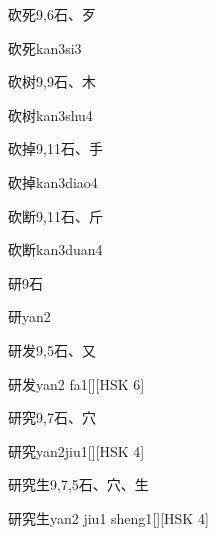 \begin{Entry}{砍死}{9,6}{⽯、⽍}
  \begin{Phonetics}{砍死}{kan3si3}
  \end{Phonetics}
\end{Entry}

\begin{Entry}{砍树}{9,9}{⽯、⽊}
  \begin{Phonetics}{砍树}{kan3shu4}
  \end{Phonetics}
\end{Entry}

\begin{Entry}{砍掉}{9,11}{⽯、⼿}
  \begin{Phonetics}{砍掉}{kan3diao4}
  \end{Phonetics}
\end{Entry}

\begin{Entry}{砍断}{9,11}{⽯、⽄}
  \begin{Phonetics}{砍断}{kan3duan4}
  \end{Phonetics}
\end{Entry}

\begin{Entry}{研}{9}{⽯}
  \begin{Phonetics}{研}{yan2}
  \end{Phonetics}
\end{Entry}

\begin{Entry}{研发}{9,5}{⽯、⼜}
  \begin{Phonetics}{研发}{yan2 fa1}[][HSK 6]
  \end{Phonetics}
\end{Entry}

\begin{Entry}{研究}{9,7}{⽯、⽳}
  \begin{Phonetics}{研究}{yan2jiu1}[][HSK 4]
  \end{Phonetics}
\end{Entry}

\begin{Entry}{研究生}{9,7,5}{⽯、⽳、⽣}
  \begin{Phonetics}{研究生}{yan2 jiu1 sheng1}[][HSK 4]
  \end{Phonetics}
\end{Entry}


